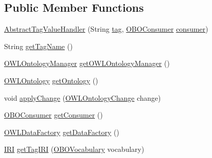 \subsection*{Public Member Functions}
\begin{DoxyCompactItemize}
\item 
\hyperlink{classorg_1_1coode_1_1owlapi_1_1obo_1_1parser_1_1_abstract_tag_value_handler_a971356f8149aecca17ee77d679906339}{Abstract\-Tag\-Value\-Handler} (String \hyperlink{classorg_1_1coode_1_1owlapi_1_1obo_1_1parser_1_1_abstract_tag_value_handler_af9d0866392b74b57ec524c6ae0f6e7be}{tag}, \hyperlink{classorg_1_1coode_1_1owlapi_1_1obo_1_1parser_1_1_o_b_o_consumer}{O\-B\-O\-Consumer} \hyperlink{classorg_1_1coode_1_1owlapi_1_1obo_1_1parser_1_1_abstract_tag_value_handler_ab27f1ff22d15640c5f81585f18265137}{consumer})
\item 
String \hyperlink{classorg_1_1coode_1_1owlapi_1_1obo_1_1parser_1_1_abstract_tag_value_handler_ab2cb02762280ec948aecd850f13b91d5}{get\-Tag\-Name} ()
\item 
\hyperlink{interfaceorg_1_1semanticweb_1_1owlapi_1_1model_1_1_o_w_l_ontology_manager}{O\-W\-L\-Ontology\-Manager} \hyperlink{classorg_1_1coode_1_1owlapi_1_1obo_1_1parser_1_1_abstract_tag_value_handler_a3e92dffd47ba018c73d0c30d183ac135}{get\-O\-W\-L\-Ontology\-Manager} ()
\item 
\hyperlink{interfaceorg_1_1semanticweb_1_1owlapi_1_1model_1_1_o_w_l_ontology}{O\-W\-L\-Ontology} \hyperlink{classorg_1_1coode_1_1owlapi_1_1obo_1_1parser_1_1_abstract_tag_value_handler_ae4149bb55e725e144d4035306a803905}{get\-Ontology} ()
\item 
void \hyperlink{classorg_1_1coode_1_1owlapi_1_1obo_1_1parser_1_1_abstract_tag_value_handler_a5dd13c61ea23ba4e2d993aab0cd1210c}{apply\-Change} (\hyperlink{classorg_1_1semanticweb_1_1owlapi_1_1model_1_1_o_w_l_ontology_change}{O\-W\-L\-Ontology\-Change} change)
\item 
\hyperlink{classorg_1_1coode_1_1owlapi_1_1obo_1_1parser_1_1_o_b_o_consumer}{O\-B\-O\-Consumer} \hyperlink{classorg_1_1coode_1_1owlapi_1_1obo_1_1parser_1_1_abstract_tag_value_handler_a49d52adab59dd3209175eab687fc03cf}{get\-Consumer} ()
\item 
\hyperlink{interfaceorg_1_1semanticweb_1_1owlapi_1_1model_1_1_o_w_l_data_factory}{O\-W\-L\-Data\-Factory} \hyperlink{classorg_1_1coode_1_1owlapi_1_1obo_1_1parser_1_1_abstract_tag_value_handler_ad8e4e5572eac6f9dbd0c440864514d44}{get\-Data\-Factory} ()
\item 
\hyperlink{classorg_1_1semanticweb_1_1owlapi_1_1model_1_1_i_r_i}{I\-R\-I} \hyperlink{classorg_1_1coode_1_1owlapi_1_1obo_1_1parser_1_1_abstract_tag_value_handler_a745fab6a605c4307f7eaa84ac2ee05c7}{get\-Tag\-I\-R\-I} (\hyperlink{enumorg_1_1coode_1_1owlapi_1_1obo_1_1parser_1_1_o_b_o_vocabulary}{O\-B\-O\-Vocabulary} vocabulary)

\end{DoxyCompactItemize}
